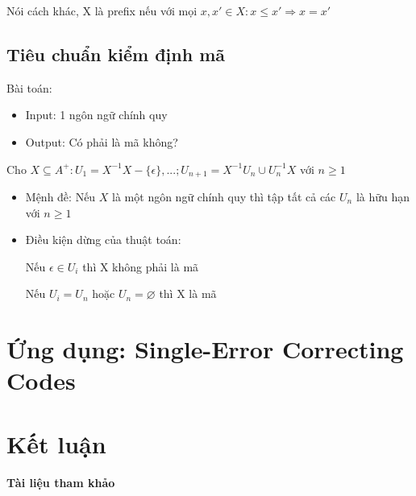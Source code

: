 \documentclass[14pt]{extreport}
\begin{document}
Nói cách khác, X là prefix nếu với mọi $x,x' \in X: x\leq x' \Rightarrow x=x'$

\section{Tiêu chuẩn kiểm định mã}
Bài toán:
\begin{itemize}
\item Input: 1 ngôn ngữ chính quy
\item Output: Có phải là mã không?
\end{itemize}
Cho $X\subseteq A^+: U_1=X^{-1}X-\{\epsilon\},...;U_{n+1}=X^{-1}U_n \cup U_n^{-1}X$ với $n\geq 1$
\begin{itemize}
\item Mệnh đề: Nếu $X$ là một ngôn ngữ chính quy thì tập tất cả các $U_n$ là hữu hạn với $n\geq 1$

\item Điều kiện dừng của thuật toán:

Nếu $\epsilon \in U_i $ thì X không phải là mã

Nếu $U_i=U_n$ hoặc $U_n=\varnothing$ thì X là mã
\end{itemize}

\chapter{Ứng dụng: Single-Error Correcting Codes}




\chapter{Kết luận}
{\huge \textbf{Tài liệu tham khảo}}
\end{document}
